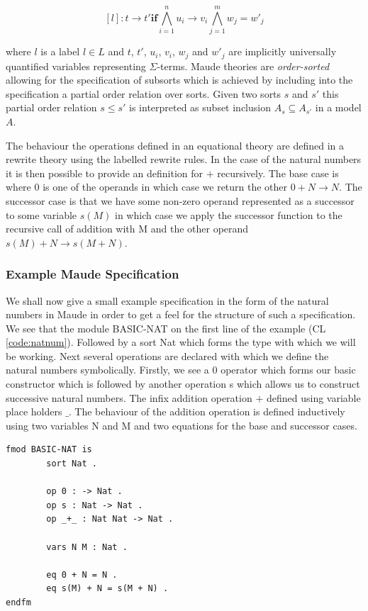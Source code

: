 $$ [l] : t \to t' \mathbf{if} \bigwedge^{n}_{i = 1} u_i \to v_i \bigwedge^{m}_{j = 1} w_j = w'_j $$

where $l$ is a label $l \in L$ and $t$, $t'$, $u_i$, $v_i$, $w_j$ and $w'_j$ are implicitly universally quantified variables representing $\Sigma$-terms. Maude theories are \emph{order-sorted} allowing for the specification of subsorts which is achieved by including into the specification a partial order relation over sorts. Given two sorts $s$ and $s'$ this partial order relation $s \leq s'$ is interpreted as subset inclusion $A_s \subseteq A_{s'}$ in a model $A$.

The behaviour the operations defined in an equational theory are defined in a rewrite theory using the labelled rewrite rules. In the case of the natural numbers it is then possible to provide an definition for $+$ recursively. The base case is where 0 is one of the operands in which case we return the other $0 + N \to N$. The successor case is that we have some non-zero operand represented as a successor to some variable $s(M)$ in which case we apply the successor function to the recursive call of addition with M and the other operand $s(M) + N \to s(M + N)$. 
 

\subsubsection{Example Maude Specification}
We shall now give a small example specification in the form of the natural numbers in Maude in order to get a feel for the structure of such a specification. We see that the module BASIC-NAT on the first line of the example (CL \ref{code:natnum}). Followed by a sort Nat which forms the type with which we will be working. Next several operations are declared with which we define the natural numbers symbolically. Firstly, we see a 0 operator which forms our basic constructor which is followed by another operation s which allows us to construct successive natural numbers. The infix addition operation $+$ defined using variable place holders  $\_$. The behaviour of the addition operation is defined inductively using two variables N and M and two equations for the base and successor cases.

\begin{lstlisting}[caption = The natural numbers in Maude, label = code:natnum]
fmod BASIC-NAT is
        sort Nat .

        op 0 : -> Nat .
        op s : Nat -> Nat .
        op _+_ : Nat Nat -> Nat .

        vars N M : Nat .

        eq 0 + N = N .
        eq s(M) + N = s(M + N) .
endfm
\end{lstlisting}



